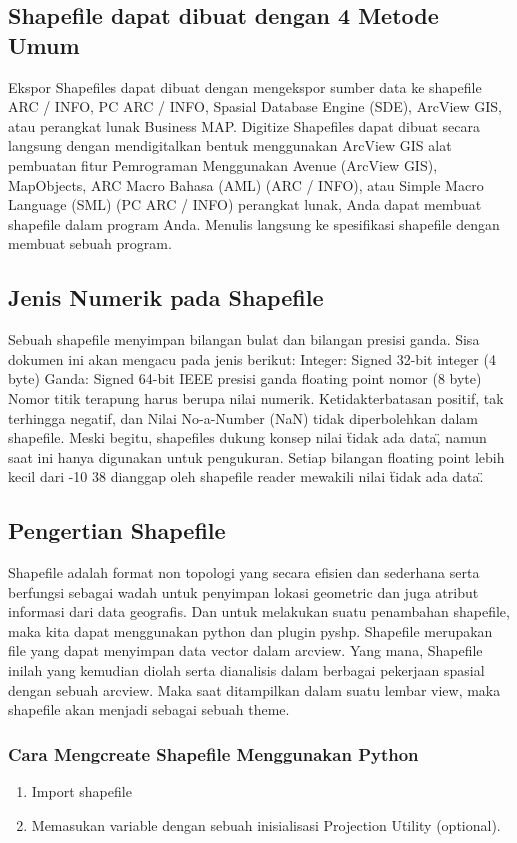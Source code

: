 \subsection{Shapefile dapat dibuat dengan 4 Metode Umum}
Ekspor Shapefiles dapat dibuat dengan mengekspor sumber data ke shapefile
ARC / INFO, PC ARC / INFO, Spasial Database Engine (SDE), ArcView GIS,
atau perangkat lunak Business MAP.
Digitize Shapefiles dapat dibuat secara langsung dengan mendigitalkan bentuk menggunakan ArcView GIS
alat pembuatan fitur
Pemrograman Menggunakan Avenue (ArcView GIS), MapObjects, ARC Macro
Bahasa (AML) (ARC / INFO), atau Simple Macro Language (SML)
(PC ARC / INFO) perangkat lunak, Anda dapat membuat shapefile dalam program Anda.
Menulis langsung ke spesifikasi shapefile dengan membuat sebuah program. 

\subsection{Jenis Numerik pada Shapefile}
Sebuah shapefile menyimpan bilangan bulat dan bilangan presisi ganda. Sisa dokumen ini 
akan mengacu pada jenis berikut: 
Integer: Signed 32-bit integer (4 byte) 
Ganda: Signed 64-bit IEEE presisi ganda floating point nomor (8 byte) 
Nomor titik terapung harus berupa nilai numerik. Ketidakterbatasan positif, tak terhingga negatif, dan 
Nilai No-a-Number (NaN) tidak diperbolehkan dalam shapefile. Meski begitu, shapefiles 
dukung konsep nilai \"tidak ada data\", namun saat ini hanya digunakan untuk pengukuran. 
Setiap bilangan floating point lebih kecil dari -10 38 dianggap oleh shapefile reader 
mewakili nilai \"tidak ada data\". 

\subsection{Pengertian Shapefile}
	Shapefile adalah format non topologi yang secara efisien dan sederhana serta berfungsi sebagai wadah untuk penyimpan lokasi geometric dan juga atribut informasi dari data geografis. Dan untuk melakukan suatu penambahan shapefile, maka kita dapat menggunakan python dan plugin pyshp. Shapefile merupakan file yang dapat menyimpan data vector dalam arcview. Yang mana, Shapefile inilah yang kemudian diolah serta dianalisis dalam berbagai pekerjaan spasial dengan sebuah arcview. Maka saat ditampilkan dalam suatu lembar view, maka shapefile  akan menjadi sebagai sebuah theme.

\subsubsection{Cara Mengcreate Shapefile Menggunakan Python}
\begin{enumerate}
    \item Import shapefile
    \item Memasukan variable dengan sebuah inisialisasi
Projection Utility (optional).
\end{enumerate}

